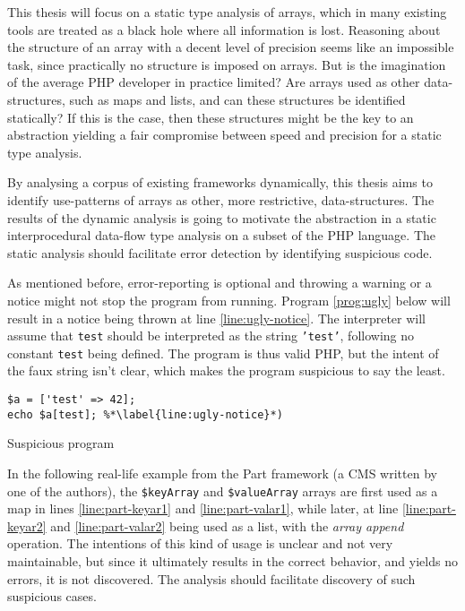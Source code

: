 This thesis will focus on a static type analysis of arrays, which in many existing tools are treated as a black hole where all information is lost.  Reasoning about the structure of an array with a decent level of precision seems like an impossible task, since practically no structure is imposed on arrays. But is the imagination of the average PHP developer in practice limited? Are arrays used as other data-structures, such as maps and lists, and can these structures be identified statically? If this is the case, then these structures might be the key to an abstraction yielding a fair compromise between speed and precision for a static type analysis. 

By analysing a corpus of existing frameworks dynamically, this thesis aims to identify use-patterns of arrays as other, more restrictive, data-structures. The results of the dynamic analysis is going to motivate the abstraction in a static interprocedural data-flow type analysis on a subset of the PHP language. The static analysis should facilitate error detection by identifying suspicious code. 

As mentioned before, error-reporting is optional and throwing a warning or a notice might not stop the program from running. Program \ref{prog:ugly} below will result in a notice being thrown at line \ref{line:ugly-notice}. The interpreter will assume that \texttt{test} should be interpreted as the string \texttt{'test'}, following no constant \texttt{test} being defined. The program is thus valid PHP, but the intent of the faux string isn't clear, which makes the program suspicious to say the least.  

\begin{program}
\centering 
\begin{lstlisting}
$a = ['test' => 42];
echo $a[test]; %*\label{line:ugly-notice}*)
\end{lstlisting}
\caption{Suspicious program \label{prog:ugly}}
\end{program}

In the following real-life example from the Part framework (a CMS written by one of the authors), the \texttt{\$keyArray} and \texttt{\$valueArray} arrays are first used as a map in lines \ref{line:part-keyar1} and \ref{line:part-valar1}, while later, at line \ref{line:part-keyar2} and \ref{line:part-valar2} being used as a list, with the \emph{array append} operation. The intentions of this kind of usage is unclear and not very maintainable, but since it ultimately results in the correct behavior, and yields no errors, it is not discovered. The analysis should facilitate discovery of such suspicious cases.

